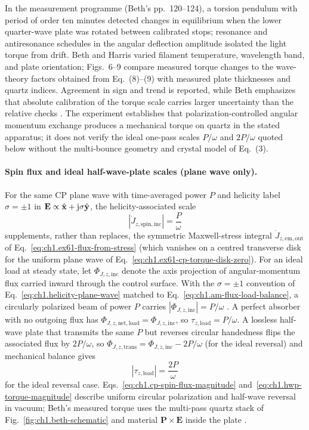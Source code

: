 In the measurement programme (Beth's pp.~120--124), a torsion pendulum with period of order ten minutes detected changes in equilibrium when the lower quarter-wave plate was rotated between calibrated stops; resonance and antiresonance schedules in the angular deflection amplitude isolated the light torque from drift. Beth and Harris varied filament temperature, wavelength band, and plate orientation; Figs.~6--9 compare measured torque changes to the wave-theory factors obtained from Eq.~(8)--(9) with measured plate thicknesses and quartz indices. Agreement in sign and trend is reported, while Beth emphasizes that absolute calibration of the torque scale carries larger uncertainty than the relative checks \cite{beth1936}. The experiment establishes that polarization-controlled angular momentum exchange produces a mechanical torque on quartz in the stated apparatus; it does not verify the ideal one-pass scales $P/\omega$ and $2P/\omega$ quoted below without the multi-bounce geometry and crystal model of Eq.~(3).

\paragraph{Spin flux and ideal half-wave-plate scales (plane wave only).}
For the same CP plane wave with time-averaged power $P$ and helicity label $\sigma=\pm1$ in $\mathbf{E}\propto\hat{\mathbf{x}}+\mathrm{j}\sigma\hat{\mathbf{y}}$, the helicity-associated scale
\begin{equation}
\label{eq:ch1.cp-spin-flux-magnitude}
|\dot J_{z,\mathrm{spin,inc}}|=\frac{P}{\omega}
\end{equation}
supplements, rather than replaces, the symmetric Maxwell-stress integral $\dot J_{z,\mathrm{em,out}}$ of Eq.~\eqref{eq:ch1.ex61-flux-from-stress} (which vanishes on a centred transverse disk for the uniform plane wave of Eq.~\eqref{eq:ch1.ex61-cp-torque-disk-zero}). For an ideal load at steady state, let $\Phi_{J,z,\mathrm{inc}}$ denote the axis projection of angular-momentum flux carried inward through the control surface. With the $\sigma=\pm1$ convention of Eq.~\eqref{eq:ch1.helicity-plane-wave} matched to Eq.~\eqref{eq:ch1.am-flux-load-balance}, a circularly polarized beam of power $P$ carries $|\Phi_{J,z,\mathrm{inc}}|=P/\omega$ \cite{beth1936,belinfante1940,stratton1941}. A perfect absorber with no outgoing flux has $\Phi_{J,z,\mathrm{net,load}}=\Phi_{J,z,\mathrm{inc}}$, so $\tau_{z,\mathrm{load}}=P/\omega$. A lossless half-wave plate that transmits the same $P$ but reverses circular handedness flips the associated flux by $2P/\omega$, so $\Phi_{J,z,\mathrm{trans}}=\Phi_{J,z,\mathrm{inc}}-2P/\omega$ (for the ideal reversal) and mechanical balance gives
\begin{equation}
\label{eq:ch1.hwp-torque-magnitude}
|\tau_{z,\mathrm{load}}|=\frac{2P}{\omega}
\end{equation}
for the ideal reversal case. Eqs.~\eqref{eq:ch1.cp-spin-flux-magnitude} and~\eqref{eq:ch1.hwp-torque-magnitude} describe uniform circular polarization and half-wave reversal in vacuum; Beth's measured torque uses the multi-pass quartz stack of Fig.~\ref{fig:ch1.beth-schematic} and material $\mathbf P\times\mathbf E$ inside the plate \cite{beth1936}.

